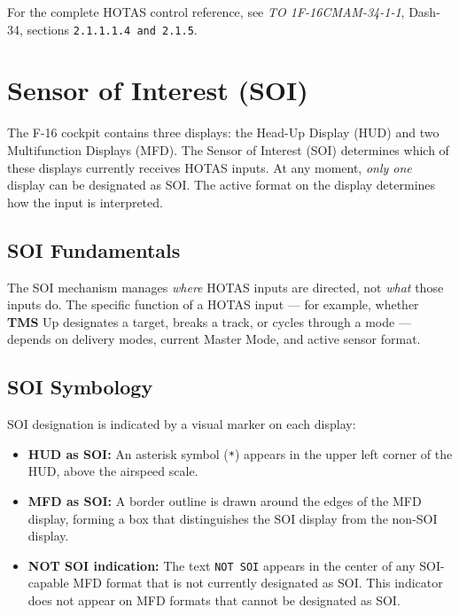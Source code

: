 \documentclass[11pt, a4paper, twoside]{report}
\newcommand{\dashrefs}[1]{\textit{TO 1F-16CMAM-34-1-1}, Dash-34, sections \texttt{#1}}
\begin{document}
For the complete HOTAS control reference, see \dashrefs{2.1.1.1.4 and 2.1.5}.

\section{Sensor of Interest (SOI)}
\label{sec:C2-S1}

The F-16 cockpit contains three displays: the Head-Up Display (HUD) and two Multifunction Displays (MFD). The Sensor of Interest (SOI) determines which of these displays currently receives HOTAS inputs. At any moment, \textit{only one} display can be designated as SOI. The active format on the display determines how the input is interpreted.

\subsection{SOI Fundamentals}
\label{sec:C2-S1-S1}

The SOI mechanism manages \textit{where} HOTAS inputs are directed, not \textit{what} those inputs do. The specific function of a HOTAS input --- for example, whether \textbf{TMS} Up designates a target, breaks a track, or cycles through a mode --- depends on delivery modes, current Master Mode, and active sensor format.

\subsection{SOI Symbology}
\label{sec:C2-S1-S2}

SOI designation is indicated by a visual marker on each display:

\begin{itemize}
	\item \textbf{HUD as SOI:} An asterisk symbol (\texttt{*}) appears in the upper left corner of the HUD, above the airspeed scale.
	\item \textbf{MFD as SOI:} A border outline is drawn around the edges of the MFD display, forming a box that distinguishes the SOI display from the non-SOI display.
	\item \textbf{NOT SOI indication:} The text \texttt{NOT SOI} appears in the center of any SOI-capable MFD format that is not currently designated as SOI. This indicator does not appear on MFD formats that cannot be designated as SOI.
\end{itemize}
\end{document}
